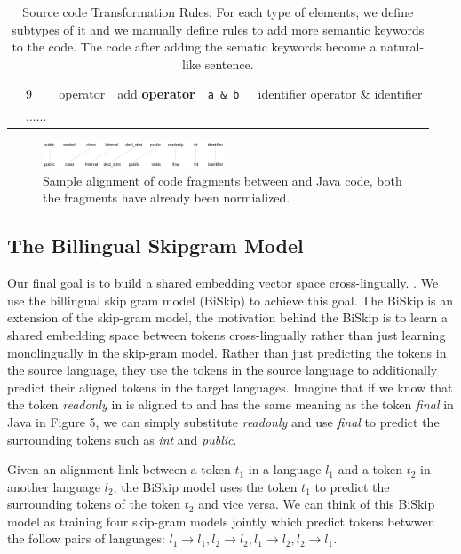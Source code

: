 \begin{table}
{\begin{tabular}{p{2cm}|p{0.79cm}|p{2cm}|p{3cm}|p{4cm}|p{4cm}}
		&9& operator & add \textbf{operator} & \texttt{a \& b }&  identifier operator \& identifier \\\cline{2-6}
		&......&&&& \\\cline{2-6}
	
	
		\hline
	\end{tabular}}
	\medskip
	\caption{Source code Transformation Rules: For each type of elements, we define subtypes of it and we manually define rules to add more semantic keywords to the code. The code after adding the sematic keywords become a natural-like sentence.}
\end{table}


\begin{figure}[t!]
	
	\includegraphics[width=0.48\textwidth]{alignment}
	\caption{Sample alignment of code fragments between  and Java code, both the fragments have already been normialized.}
	\label{fig:alignment}
\end{figure}

\subsection{The Billingual Skipgram Model}

Our final goal is to build a shared embedding vector space cross-lingually. . We use the billingual skip gram model (BiSkip) \cite{luong2015bilingual} to achieve this goal. The BiSkip is an extension of the skip-gram model, the motivation behind the BiSkip is to learn a shared embedding space between tokens cross-lingually rather than just learning monolingually in the skip-gram model. Rather than just predicting the tokens in the source language, they use the tokens in the source language to additionally predict their aligned tokens in the target languages. Imagine that if we know that the token \textit{readonly} in  is aligned to and has the same meaning as the token \textit{final} in Java in Figure 5, we can simply substitute \textit{readonly} and use \textit{final} to predict the surrounding tokens such as \textit{int} and \textit{public}. 

Given an alignment link between a token $t_{1}$ in a language $l_{1}$ and a token $t_{2}$ in another language $l_{2}$, the BiSkip model uses the token $t_{1}$ to predict the surrounding tokens of the token $t_{2}$ and vice versa. We can think of this BiSkip model as training four skip-gram models jointly which predict tokens betwwen the follow pairs of languages: $l_{1} \rightarrow l_{1}, l_{2} \rightarrow l_{2}, l_{1} \rightarrow l_{2}, l_{2} \rightarrow l_{1}$.

